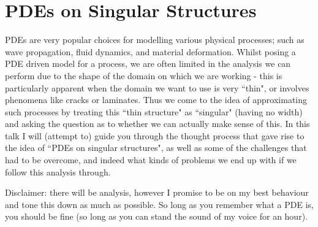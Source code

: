 \documentclass[11pt]{report}
\begin{document}
\chapter*{PDEs on Singular Structures}

PDEs are very popular choices for modelling various physical processes; such as wave propagation, fluid dynamics, and material deformation.
Whilst posing a PDE driven model for a process, we are often limited in the analysis we can perform due to the shape of the domain on which we are working - this is particularly apparent when the domain we want to use is very ``thin", or involves phenomena like cracks or laminates.
Thus we come to the idea of approximating such processes by treating this ``thin structure" as ``singular" (having no width) and asking the question as to whether we can actually make sense of this.
In this talk I will (attempt to) guide you through the thought process that gave rise to the idea of ``PDEs on singular structures", as well as some of the challenges that had to be overcome, and indeed what kinds of problems we end up with if we follow this analysis through. \newline

Disclaimer: there will be analysis, however I promise to be on my best behaviour and tone this down as much as possible.
So long as you remember what a PDE is, you should be fine (so long as you can stand the sound of my voice for an hour).
\end{document}
